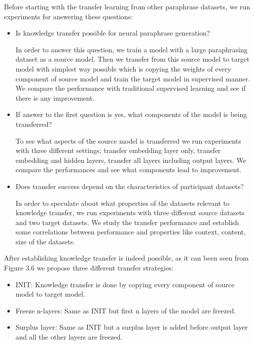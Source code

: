 Before starting with the transfer learning from other paraphrase datasets, we run experiments for answering these questions:

\begin{itemize}

\item Is knowledge transfer possible for neural paraphrase generation?

In order to answer this question, we train a model with a large paraphrasing dataset as a source model. Then we transfer from this source model to target model with simplest way possible which is copying the weights of every component of source model and train the target model in supervised manner. We compare the performance with traditional supervised learning and see if there is any improvement.

\item If answer to the first question is yes, what components of the model is being transferred?

To see what aspects of the source model is transferred we run experiments with three different settings; transfer embedding layer only, transfer embedding and hidden layers, transfer all layers including output layers. We compare the performances and see what components lead to improvement. 

\item Does transfer success depend on the characteristics of participant datasets?

In order to speculate about what properties of the datasets relevant to knowledge transfer, we run experiments with three different source datasets and two target datasets. We study the transfer performance and establish some correlations between performance and properties like context, content, size of the datasets.

\end{itemize}

After establishing knowledge transfer is indeed possible, as it can been seen from Figure 3.6 we propose three different transfer strategies:

\begin{itemize}

\item INIT: Knowledge transfer is done by copying every component of source model to target model.  

\item Freeze n-layers: Same as INIT but first n layers of the model are freezed.

\item Surplus layer:  Same as INIT but a surplus layer is added before output layer and all the other layers are freezed.

\end{itemize}

